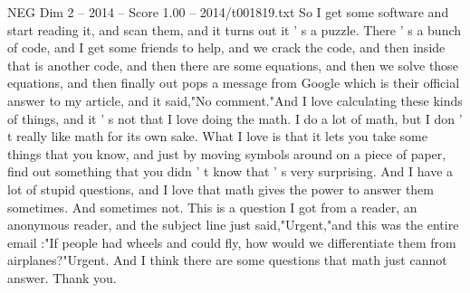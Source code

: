 \begin{textsample}{NEG Dim 2 – 2014 – Score 1.00 – 2014/t001819.txt}
So I get some software and start reading it, and scan them, and it turns out it ' s a puzzle.
There ' s a bunch of code, and I get some friends to help, and we crack the code, and then inside that is another code, and then there are some equations, and then we solve those equations, and then finally out pops a message from Google which is their official answer to my article, and it said,"No comment."And I love calculating these kinds of things, and it ' s not that I love doing the math.
I do a lot of math, but I don ' t really like math for its own sake.
What I love is that it lets you take some things that you know, and just by moving symbols around on a piece of paper, find out something that you didn ' t know that ' s very surprising.
And I have a lot of stupid questions, and I love that math gives the power to answer them sometimes.
And sometimes not.
This is a question I got from a reader, an anonymous reader, and the subject line just said,"Urgent,"and this was the entire email :"If people had wheels and could fly, how would we differentiate them from airplanes?"Urgent.
And I think there are some questions that math just cannot answer.
Thank you.

\end{textsample}
